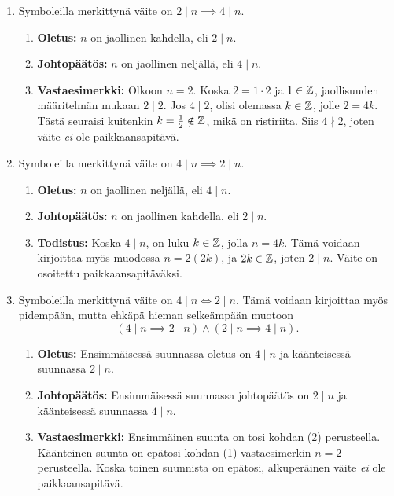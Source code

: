 \documentclass[12pt,a4paper]{article}
\begin{document}
\begin{solution}
  \leavevmode\par
  \begin{enumerate}[label=(\arabic*), nosep]
    \item Symboleilla merkittynä väite on \(2 \mid n \implies 4 \mid n\).
    \begin{enumerate}[label=\alph*), nosep]
      \item \textbf{Oletus:} \(n\) on jaollinen kahdella, eli \(2 \mid n\).
      \item \textbf{Johtopäätös:} \(n\) on jaollinen neljällä, eli \(4 \mid n\).
      \item \textbf{Vastaesimerkki:} Olkoon \(n = 2\). Koska \(2 = 1\cdot 2\) ja
        \(1 \in \mathbb{Z}\), jaollisuuden määritelmän mukaan
        \(2 \mid 2\). Jos \(4 \mid 2\), olisi olemassa
        \(k \in \mathbb{Z}\), jolle \(2 = 4k\). Tästä seuraisi kuitenkin
        \(k = \frac{1}{2} \notin \mathbb{Z}\), mikä on ristiriita. Siis \(4 \nmid 2\),
        joten väite \emph{ei} ole paikkaansapitävä.
    \end{enumerate}
  \item Symboleilla merkittynä väite on \(4 \mid n \implies 2 \mid n\).
  \begin{enumerate}[label=\alph*), nosep]
    \item \textbf{Oletus:} \(n\) on jaollinen neljällä, eli \(4 \mid n\).
    \item \textbf{Johtopäätös:} \(n\) on jaollinen kahdella, eli \(2 \mid n\).
    \item \textbf{Todistus:} Koska \(4 \mid n\), on luku \(k \in \mathbb{Z}\), jolla
      \(n = 4k\). Tämä voidaan kirjoittaa myös muodossa \(n = 2(2k)\),
      ja \(2k \in \mathbb{Z}\), joten \(2 \mid n\). Väite on osoitettu
      paikkaansapitäväksi.
  \end{enumerate}
\item Symboleilla merkittynä väite on \(4 \mid n \iff 2 \mid n\).
  Tämä voidaan kirjoittaa myös pidempään, mutta ehkäpä hieman selkeämpään
  muotoon \[(4 \mid n \implies 2 \mid n) \wedge (2 \mid n \implies 4 \mid n).\]
\begin{enumerate}[label=\alph*), nosep]
  \item \textbf{Oletus:} Ensimmäisessä suunnassa oletus on \(4 \mid n\) ja
    käänteisessä suunnassa \(2 \mid n\).
  \item \textbf{Johtopäätös:} Ensimmäisessä suunnassa johtopäätös on
    \(2 \mid n\) ja käänteisessä suunnassa \(4 \mid n\).
  \item \textbf{Vastaesimerkki:} Ensimmäinen suunta on tosi kohdan
    (2) perusteella. Käänteinen suunta on epätosi kohdan (1) vastaesimerkin
    \(n = 2\) perusteella. Koska toinen suunnista on epätosi, alkuperäinen
    väite \emph{ei} ole paikkaansapitävä.
\end{enumerate}
\end{enumerate}
\end{solution}
\end{document}
